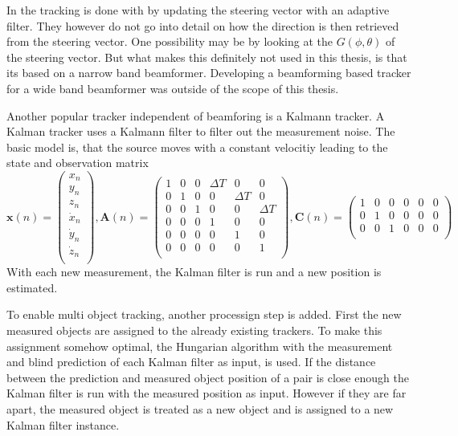 In \cite{Dornetracker} the tracking is done with by 
updating the steering vector with an adaptive filter. 
They however do not go into detail on how the direction is then
retrieved from the steering vector.
One possibility may be by looking at the $G(\phi, \theta)$ of the steering vector.
But what makes this definitely not used in this thesis, is that its based on a 
narrow band beamformer. 
Developing a beamforming based tracker for a wide band beamformer was outside of the 
scope of this thesis.

Another popular tracker independent of beamforing is a Kalmann tracker.
A Kalman tracker uses a Kalmann filter to filter out the measurement noise.
The basic model is, that the source moves with a constant velocitiy leading to 
the state and observation matrix
\begin{equation*}
	\bm{x}(n) = 
	\begin{pmatrix}
		x_n \\
		y_n \\
		z_n \\
		\dot{x}_n \\
		\dot{y}_n \\
		\dot{z}_n \\
	\end{pmatrix},
	\bm{A}(n) = 
	\begin{pmatrix}
		1 & 0 & 0 & \Delta T & 0 & 0\\
		0 & 1 & 0 & 0 & \Delta T  & 0\\
		0 & 0 & 1 & 0 & 0 & \Delta T \\
		0 & 0 & 0 & 1 & 0 & 0\\
		0 & 0 & 0 & 0 & 1 & 0\\
		0 & 0 & 0 & 0 & 0 & 1\\		
	\end{pmatrix}, 
	\bm{C}(n) = 
	\begin{pmatrix}
		1 & 0 & 0 & 0 & 0 & 0\\
		0 & 1 & 0 & 0 & 0 & 0\\
		0 & 0 & 1 & 0 & 0 & 0 \\	
	\end{pmatrix}
\end{equation*}
With each new measurement, the Kalman filter is run and a new position is 
estimated.

To enable multi object tracking, another processign step is added.
First the new measured objects are assigned to the already
existing trackers. 
To make this assignment somehow optimal, the Hungarian algorithm 
with the measurement and blind prediction of each Kalman filter as input, is used.
If the distance between the prediction and measured object position of a pair is close enough
the Kalman filter is run with the measured position as input.
However if they are far apart, the measured object is treated as a new object
and is assigned to a new Kalman filter instance.


